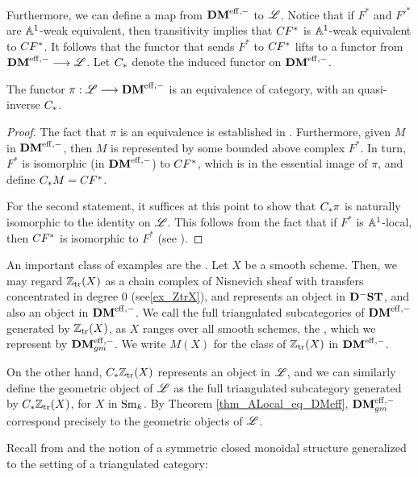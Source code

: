 Furthermore, we can define a map from $\DMeff$ to $\ALocal$. 
Notice that if $F^*$ and ${F'}^*$ are $\A^1$-weak equivalent, then
transitivity implies that $\suslC[] F^*$ is $\A^1$-weak equivalent 
to $\suslC[] F^*$. It follows that the functor that sends $F^*$
to $\suslC[] F^*$ lifts to a functor from $\DMeff \to \ALocal$.
Let $\suslC$ denote the induced functor on $\DMeff$.

\begin{thm}\label{thm_ALocal_eq_DMeff}
The functor $\pi: \ALocal \to \DMeff$ is an equivalence of 
category, with an quasi-inverse $\suslC$.
\end{thm}

\begin{proof}
The fact that $\pi$ is an equivalence is established in
\cite[14.11]{MVW}. Furthermore, given $M$ in
$\DMeff$, then $M$ is represented by some bounded above complex 
$F^*$. In turn, $F^*$ is isomorphic (in $\DMeff$) to $\suslC[] 
F^*$, which is in the essential image of $\pi$, and define
$\suslC M = \suslC[] F^*$. 

For the second statement, it suffices at this point to show that 
$\suslC \pi$ is naturally isomorphic to the identity on $\ALocal$. 
This follows from the fact that if $F^*$ is $\A^1$-local, then 
$\suslC[] F^*$ is isomorphic to $F^*$ (see \cite[14.9]{MVW}).
\end{proof}

\begin{ex}\label{ex_geo_obj}
An important class of examples are the . 
Let $X$ be a smooth scheme. Then, we may regard $\Ztr(X)$ as a
chain complex of Nisnevich sheaf with transfers concentrated
in degree 0 (see\ref{ex_ZtrX}), and represents an object in
$\DShCor$, and also an object in $\DMeff$. We call the full
triangulated subcategories of $\DMeff$ generated by $\Ztr(X)$, as 
$X$ ranges over all smooth schemes, the , which we represent by $\DMeffgm$. We write $M(X)$ for 
the class of $\Ztr(X)$ in $\DMeff$.

On the other hand, $\suslC \Ztr(X)$ represents an object in 
$\ALocal$, and we can similarly define the geometric object of 
$\ALocal$ as the full triangulated subcategory generated by
$\suslC \Ztr(X)$, for $X$ in $\Sm$. By Theorem 
\ref{thm_ALocal_eq_DMeff}, $\DMeffgm$ correspond precisely to
the geometric objects of $\ALocal$.
\end{ex}

Recall from \cite[1.13]{MK} and \cite[8A.1]{MVW} the notion of a 
symmetric closed monoidal structure generalized to the setting of 
a triangulated category:

